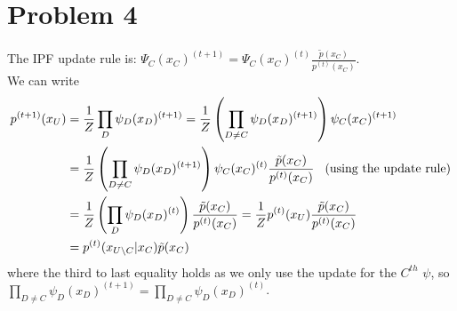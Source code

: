 \documentclass[12pt]{article}
\begin{document}
\section*{Problem 4}
\label{sec:prob4}

The IPF update rule is: $\Psi_C(x_C)^{(t+1)} = \Psi_C(x_C)^{(t)} \frac{\tilde{p}(x_C)}{p^{(t)}(x_C)}$.\\

We can write
\begin{equation}
    \begin{split}
        p^{(t+1)}(x_U) 
            &= \frac{1}{Z} \prod_D \psi_D(x_D)^{(t+1)}
                = \frac{1}{Z} \left( \prod_{D \neq C} \psi_D(x_D)^{(t+1)} \right) \psi_C(x_C)^{(t+1)}\\
            &= \frac{1}{Z} \left( \prod_{D \neq C} \psi_D(x_D)^{(t+1)} \right) 
                \psi_C(x_C)^{(t)} \frac{\tilde{p}(x_C)}{p^{(t)}(x_C)}  \hspace{3mm} 
                \text{(using the update rule)} \\
            &= \frac{1}{Z} \left( \prod_{D} \psi_D(x_D)^{(t)} \right) 
                \frac{\tilde{p}(x_C)}{p^{(t)}(x_C)} 
                = \frac{1}{Z} p^{(t)}(x_U) \frac{\tilde{p}(x_C)}{p^{(t)}(x_C)} \\
            &= p^{(t)}(x_{U \setminus C} | x_C) \tilde{p}(x_C)
    \end{split}
\end{equation}
where the third to last equality holds as we only use the update for the $C^{th}$ $\psi$, so 
$\prod_{D \neq C} \psi_D(x_D)^{(t+1)} = \prod_{D \neq C} \psi_D(x_D)^{(t)}$.
\end{document}
